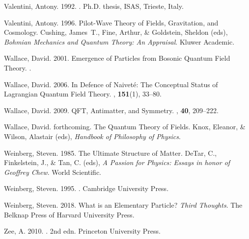 \documentclass[12pt,secnumarabic,amsmath,amssymb,balancelastpage,nofootinbib]{article}
\begin{document}
\begin{thebibliography}{}
Valentini, Antony. 1992.
.
\newblock Ph.D. thesis, ISAS, Trieste, Italy.

Valentini, Antony. 1996.
\newblock Pilot-Wave Theory of Fields, Gravitation, and Cosmology.
 Cushing, James~T., Fine, Arthur, \&
  Goldstein, Sheldon (eds), {\em Bohmian Mechanics and Quantum Theory: An
  Appraisal}.
\newblock Kluwer Academic.

Wallace, David. 2001.
\newblock Emergence of Particles from Bosonic Quantum Field Theory.
.

Wallace, David. 2006.
\newblock In Defence of Naivet\'{e}: The Conceptual Status of Lagrangian
  Quantum Field Theory.
, {\bf 151}(1), 33--80.

Wallace, David. 2009.
\newblock QFT, Antimatter, and Symmetry.
, {\bf 40},
  209--222.

Wallace, David. forthcoming.
\newblock The Quantum Theory of Fields.
 Knox, Eleanor, \& Wilson, Alastair (eds), {\em Handbook of
  Philosophy of Physics}.

Weinberg, Steven. 1985.
\newblock The Ultimate Structure of Matter.
 DeTar, C., Finkelstein, J., \& Tan, C.
  (eds), {\em A Passion for Physics: Essays in honor of Geoffrey Chew}.
\newblock World Scientific.

Weinberg, Steven. 1995.
.
\newblock Cambridge University Press.

Weinberg, Steven. 2018.
\newblock What is an Elementary Particle?
 {\em Third Thoughts}.
\newblock The Belknap Press of Harvard University Press.

Zee, A. 2010.
. 2nd edn.
\newblock Princeton University Press.

\end{thebibliography}
\end{document}
